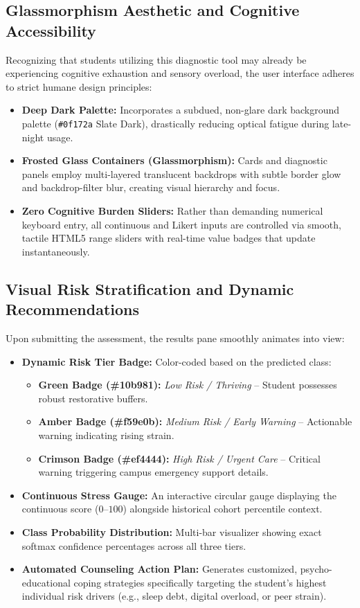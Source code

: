 \documentclass[12pt,a4paper,oneside]{report}
\begin{document}
\subsection{Glassmorphism Aesthetic and Cognitive Accessibility}
Recognizing that students utilizing this diagnostic tool may already be experiencing cognitive exhaustion and sensory overload, the user interface adheres to strict humane design principles:
\begin{itemize}
    \item \textbf{Deep Dark Palette:} Incorporates a subdued, non-glare dark background palette (\texttt{\#0f172a} Slate Dark), drastically reducing optical fatigue during late-night usage.
    \item \textbf{Frosted Glass Containers (Glassmorphism):} Cards and diagnostic panels employ multi-layered translucent backdrops with subtle border glow and backdrop-filter blur, creating visual hierarchy and focus.
    \item \textbf{Zero Cognitive Burden Sliders:} Rather than demanding numerical keyboard entry, all continuous and Likert inputs are controlled via smooth, tactile HTML5 range sliders with real-time value badges that update instantaneously.
\end{itemize}

\subsection{Visual Risk Stratification and Dynamic Recommendations}
Upon submitting the assessment, the results pane smoothly animates into view:
\begin{itemize}
    \item \textbf{Dynamic Risk Tier Badge:} Color-coded based on the predicted class:
    \begin{itemize}
        \item \textbf{Green Badge (\#10b981):} \emph{Low Risk / Thriving} -- Student possesses robust restorative buffers.
        \item \textbf{Amber Badge (\#f59e0b):} \emph{Medium Risk / Early Warning} -- Actionable warning indicating rising strain.
        \item \textbf{Crimson Badge (\#ef4444):} \emph{High Risk / Urgent Care} -- Critical warning triggering campus emergency support details.
    \end{itemize}
    \item \textbf{Continuous Stress Gauge:} An interactive circular gauge displaying the continuous score ($0$--$100$) alongside historical cohort percentile context.
    \item \textbf{Class Probability Distribution:} Multi-bar visualizer showing exact softmax confidence percentages across all three tiers.
    \item \textbf{Automated Counseling Action Plan:} Generates customized, psycho-educational coping strategies specifically targeting the student's highest individual risk drivers (e.g., sleep debt, digital overload, or peer strain).
\end{itemize}
\end{document}
